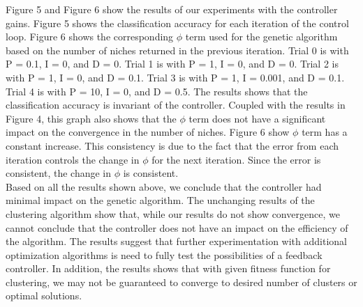 \documentclass{sig-alternate}
\begin{document}
\indent Figure 5 and Figure 6 show the results of our experiments with the controller gains. Figure 5 shows the classification accuracy for each iteration of the control loop. Figure 6 shows the corresponding $\phi$ term used for the genetic algorithm based on the number of niches returned in the previous iteration. Trial 0 is with P = 0.1, I = 0, and D = 0. Trial 1 is with P = 1, I = 0, and D = 0. Trial 2 is with P = 1, I = 0, and D = 0.1. Trial 3 is with P = 1, I = 0.001, and D = 0.1. Trial 4 is with P = 10, I = 0, and D = 0.5. The results shows that the classification accuracy is invariant of the controller. Coupled with the results in Figure 4, this graph also shows that the $\phi$ term does not have a significant impact on the convergence in the number of niches. Figure 6 show $\phi$ term has a constant increase. This consistency is due to the fact that the error from each iteration controls the change in $\phi$ for the next iteration. Since the error is consistent, the change in $\phi$ is consistent.\\
\indent Based on all the results shown above, we conclude that the controller had minimal impact on the genetic algorithm. The unchanging results of the clustering algorithm show that, while our results do not show convergence, we cannot conclude that the controller does not have an impact on the efficiency of the algorithm. The results suggest that further experimentation with additional optimization algorithms is need to fully test the possibilities of a feedback controller. In addition, the results shows that with given fitness function for clustering, we may not be guaranteed to converge to desired number of clusters or optimal solutions. 
\end{document}
